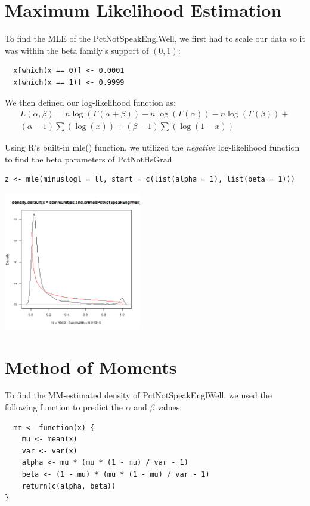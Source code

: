 \documentclass[12pt, letterpaper]{report}
\begin{document}
\pagebreak
\section{Maximum Likelihood Estimation}
To find the MLE of the PctNotSpeakEnglWell, we first had to scale our data so it was within the beta family's support of $(0, 1)$: 
\begin{lstlisting}
  x[which(x == 0)] <- 0.0001  
  x[which(x == 1)] <- 0.9999
\end{lstlisting} 

We then defined our log-likelihood function as:
\begin{multline}
L(\alpha, \beta) = n \log{(\Gamma(\alpha+\beta))} - n \log{(\Gamma(\alpha))} - n \log{(\Gamma(\beta))} + \\
(\alpha - 1) \sum(\log(x)) + (\beta-1) \sum(\log{(1-x)})
\end{multline}

Using R's built-in mle() function, we utilized the \textit{negative} log-likelihood function to find the beta parameters of PctNotHsGrad.
\begin{lstlisting}
z <- mle(minuslogl = ll, start = c(list(alpha = 1), list(beta = 1)))
\end{lstlisting} 

\begin{center}
\includegraphics[width=0.45\textwidth]{beta/PctNotSpeakEnglWell_mle}
\end{center}

\pagebreak
\section{Method of Moments}
To find the MM-estimated density of PctNotSpeakEnglWell, we used the following function to predict the $\alpha$ and $\beta$ values:
\begin{lstlisting}
  mm <- function(x) {
    mu <- mean(x)
    var <- var(x)
    alpha <- mu * (mu * (1 - mu) / var - 1)
    beta <- (1 - mu) * (mu * (1 - mu) / var - 1)
    return(c(alpha, beta))
}
\end{lstlisting} 
\end{document}
